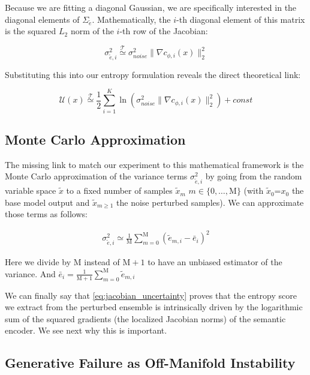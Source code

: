 Because we are fitting a diagonal Gaussian, we are specifically interested in the diagonal elements of $\Sigma_{\tilde{e}}$.
Mathematically, the $i$-th diagonal element of this matrix is the squared $L_2$ norm of the $i$-th row of the Jacobian:

\begin{equation}
\sigma_{\tilde{e},i}^2 \overset{\mathcal{T}}{\simeq} \sigma_{noise}^2 \|\nabla c_{\phi, i}(x)\|_2^2
\end{equation}

Substituting this into our entropy formulation reveals the direct theoretical link:

\begin{equation}
\mathcal{U}(x) \overset{\mathcal{T}}{\simeq} \frac{1}{2} \sum_{i=1}^K \ln\left( \sigma_{noise}^2 \|\nabla c_{\phi, i}(x)\|_2^2 \right) + const \label{eq:jacobian_uncertainty}
\end{equation}


\subsection{Monte Carlo Approximation}

The missing link to match our experiment to this mathematical framework is the Monte Carlo approximation of the variance terms $\sigma^2_{\tilde{e},i}$ by going from the random variable space $\tilde{x}$ to a fixed number of samples $\tilde{x}_m$ $m \in \{0,\dots,\text{M}\}$ (with $\tilde{x}_0$=$x_0$ the base model output and $\tilde{x}_{m\geq1}$ the noise perturbed samples). We can approximate those terms as follows:

\begin{align}
\sigma_{\tilde{e},i}^2 \simeq \frac{1}{\text{M}} \sum_{m=0}^{\text{M}} (\tilde{e}_{m,i} - \bar{e}_i)^2
\end{align}

Here we divide by $\text{M}$ instead of $\text{M}+1$ to have an unbiased estimator of the variance. And $\bar{e}_i = \frac{1}{\text{M}+1} \sum^{\text{M}}_{m=0} \tilde{e}_{m,i}$

We can finally say that \autoref{eq:jacobian_uncertainty} proves that the entropy score we extract from the perturbed ensemble is intrinsically driven by the logarithmic sum of the squared gradients (the localized Jacobian norms) of the semantic encoder. We see next why this is important.

\subsection{Generative Failure as Off-Manifold Instability}


